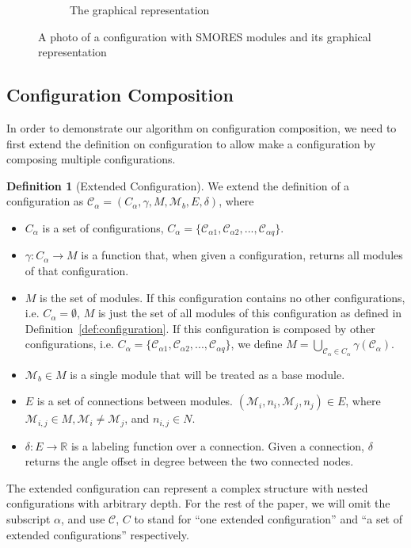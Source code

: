 \documentclass[conference]{IEEEtran}
\theoremstyle{definition}
\newtheorem{definition}{Definition}[section]
\begin{document}
\begin{figure}
\begin{center}
\begin{subfigure}[b]{0.4\columnwidth}
                \caption{The graphical representation}
                \label{fig:smores_conf_graph}
        \end{subfigure}
\end{center}
\caption{A photo of a configuration with SMORES modules and its graphical representation}
\label{fig:smores_conf}
\end{figure}


\subsection{Configuration Composition} \label{sec:conf_composition}
In order to demonstrate our algorithm on configuration composition, we need to first extend the definition on configuration to allow make a configuration by composing multiple configurations.

\begin{definition}[Extended Configuration] 
We extend the definition of a configuration as $\mathcal{C}_\alpha=(C_\alpha, \gamma, M, \mathcal{M}_b, E, \delta)$, where
\begin{itemize}
\item $C_\alpha$ is a set of configurations, $C_\alpha=\{\mathcal{C}_{\alpha1}, \mathcal{C}_{\alpha2}, ..., \mathcal{C}_{\alpha q}\}$.
\item $\gamma: C_\alpha \rightarrow M$ is a function that, when given a configuration, returns all modules of that configuration.
\item $M$ is the set of modules. If this configuration contains no other configurations, i.e. $C_\alpha = \emptyset$, $M$ is just the set of all modules of this configuration as defined in Definition~\ref{def:configuration}. If this configuration is composed by other configurations, i.e. $C_\alpha=\{\mathcal{C}_{\alpha1}, \mathcal{C}_{\alpha2}, ..., \mathcal{C}_{\alpha q}\}$, we define $M=\bigcup_{\mathcal{C}_{\alpha}\in C_{\alpha}}{\gamma(\mathcal{C}_{\alpha})}$.
\item $\mathcal{M}_b\in M$ is a single module that will be treated as a base module.
\item $E$ is a set of connections between modules. $(\mathcal{M}_i, n_i, \mathcal{M}_j, n_j)\in E$, where $\mathcal{M}_{i,j} \in M, \mathcal{M}_i \neq \mathcal{M}_j$, and $n_{i,j}\in N$.
\item $\delta: E \rightarrow \mathbb{R}$ is a labeling function over a connection. Given a connection, $\delta$ returns the angle offset in degree between the two connected nodes.
\end{itemize}
\end{definition}
The extended configuration can represent a complex structure with nested configurations with arbitrary depth. For the rest of the paper, we will omit the subscript $\alpha$, and use $\mathcal{C}$, $C$ to stand for ``one extended configuration'' and ``a set of extended configurations'' respectively.
\end{document}
